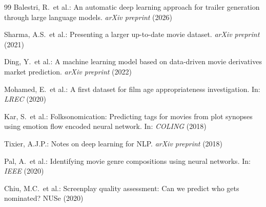 \documentclass[runningheads]{llncs}
\begin{document}
\begin{thebibliography}{99}
Balestri, R.\ et al.: An automatic deep learning approach for
trailer generation through large language models.
\emph{arXiv preprint} (2026)

Sharma, A.S.\ et al.: Presenting a larger up-to-date movie
dataset. \emph{arXiv preprint} (2021)

Ding, Y.\ et al.: A machine learning model based on data-driven
movie derivatives market prediction. \emph{arXiv preprint} (2022)

Mohamed, E.\ et al.: A first dataset for film age appropriateness
investigation. In: \emph{LREC} (2020)

Kar, S.\ et al.: Folksonomication: Predicting tags for movies from
plot synopses using emotion flow encoded neural network. In:
\emph{COLING} (2018)

Tixier, A.J.P.: Notes on deep learning for NLP.
\emph{arXiv preprint} (2018)

Pal, A.\ et al.: Identifying movie genre compositions using
neural networks. In: \emph{IEEE} (2020)

Chiu, M.C.\ et al.: Screenplay quality assessment: Can we predict
who gets nominated? NUSe (2020)

\end{thebibliography}
\end{document}
